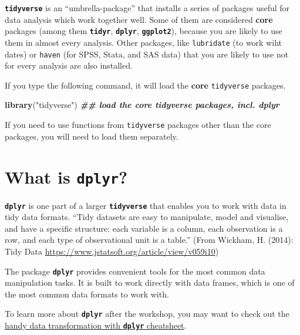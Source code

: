 \documentclass[
]{book}
\newenvironment{Shaded}{\begin{snugshade}}{\end{snugshade}}
\newcommand{\DocumentationTok}[1]{\textcolor[rgb]{0.56,0.35,0.01}{\textbf{\textit{#1}}}}
\newcommand{\FunctionTok}[1]{\textcolor[rgb]{0.13,0.29,0.53}{\textbf{#1}}}
\newcommand{\NormalTok}[1]{#1}
\newcommand{\StringTok}[1]{\textcolor[rgb]{0.31,0.60,0.02}{#1}}
\begin{document}
\textbf{\texttt{tidyverse}} is an ``umbrella-package'' that installs a series of packages useful for data analysis which work together well. Some of them are considered \textbf{core} packages (among them \textbf{\texttt{tidyr}}, \textbf{\texttt{dplyr}}, \textbf{\texttt{ggplot2}}), because you are likely to use them in almost every analysis. Other packages, like \texttt{lubridate} (to work wiht dates) or \texttt{haven} (for SPSS, Stata, and SAS data) that you are likely to use not for every analysis are also installed.

If you type the following command, it will load the \textbf{core} \texttt{tidyverse} packages.

\begin{Shaded}
\begin{Highlighting}[]
\FunctionTok{library}\NormalTok{(}\StringTok{"tidyverse"}\NormalTok{)    }\DocumentationTok{\#\# load the core tidyverse packages, incl. dplyr}
\end{Highlighting}
\end{Shaded}

If you need to use functions from \texttt{tidyverse} packages other than the core packages, you will need to load them separately.

\hypertarget{what-is-dplyr}{%
\section{\texorpdfstring{What is \textbf{\texttt{dplyr}}?}{What is dplyr?}}\label{what-is-dplyr}}

\textbf{\texttt{dplyr}} is one part of a larger \textbf{\texttt{tidyverse}} that enables you to work
with data in tidy data formats. ``Tidy datasets are easy to manipulate, model and visualise, and have a specific structure: each variable is a column, each observation is a row, and each type of observational unit is a table.'' (From Wickham, H. (2014): Tidy Data \url{https://www.jstatsoft.org/article/view/v059i10})

The package \textbf{\texttt{dplyr}} provides convenient tools for the most common data manipulation tasks. It is built to work directly with data frames, which is one of the most common data formats to work with.

To learn more about \textbf{\texttt{dplyr}} after the workshop, you may want to check out the \href{https://raw.githubusercontent.com/rstudio/cheatsheets/main/data-transformation.pdf}{handy data transformation with \textbf{\texttt{dplyr}} cheatsheet}.
\end{document}
